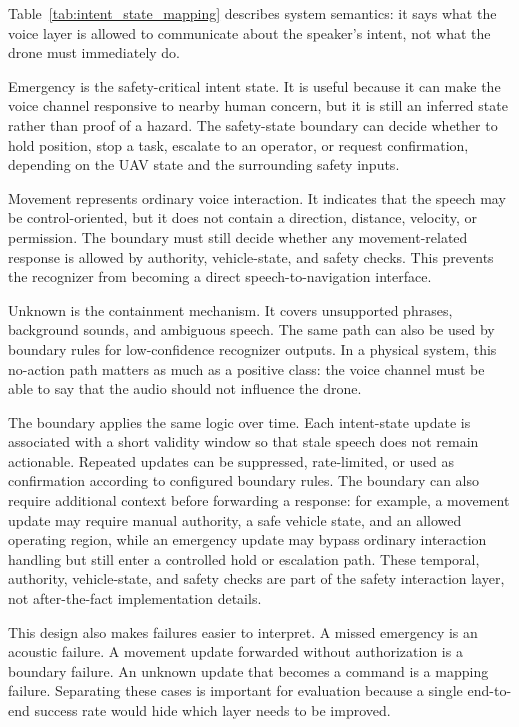 Table~\ref{tab:intent_state_mapping} describes system semantics: it says what the voice layer is allowed to communicate about the speaker's intent, not what the drone must immediately do.

Emergency is the safety-critical intent state. It is useful because it can make the voice channel responsive to nearby human concern, but it is still an inferred state rather than proof of a hazard. The safety-state boundary can decide whether to hold position, stop a task, escalate to an operator, or request confirmation, depending on the UAV state and the surrounding safety inputs.

Movement represents ordinary voice interaction. It indicates that the speech may be control-oriented, but it does not contain a direction, distance, velocity, or permission. The boundary must still decide whether any movement-related response is allowed by authority, vehicle-state, and safety checks. This prevents the recognizer from becoming a direct speech-to-navigation interface.

Unknown is the containment mechanism. It covers unsupported phrases, background sounds, and ambiguous speech. The same path can also be used by boundary rules for low-confidence recognizer outputs. In a physical system, this no-action path matters as much as a positive class: the voice channel must be able to say that the audio should not influence the drone.

The boundary applies the same logic over time. Each intent-state update is associated with a short validity window so that stale speech does not remain actionable. Repeated updates can be suppressed, rate-limited, or used as confirmation according to configured boundary rules. The boundary can also require additional context before forwarding a response: for example, a movement update may require manual authority, a safe vehicle state, and an allowed operating region, while an emergency update may bypass ordinary interaction handling but still enter a controlled hold or escalation path. These temporal, authority, vehicle-state, and safety checks are part of the safety interaction layer, not after-the-fact implementation details.

This design also makes failures easier to interpret. A missed emergency is an acoustic failure. A movement update forwarded without authorization is a boundary failure. An unknown update that becomes a command is a mapping failure. Separating these cases is important for evaluation because a single end-to-end success rate would hide which layer needs to be improved.

